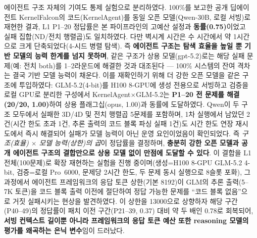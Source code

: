 \documentclass[sigplan,screen,review,anonymous]{acmart}
\begin{document}
에이전트 구조 자체의 기여도 통제 실험으로 분리하였다. 100\%를 보고한 공개 딥에이전트 KernelFalcon의 코드(KernelAgent)를 동일 오픈 모델(Qwen-30B, 로컬 서빙)로 재현한 결과, L1 P1--20 정답률은 본 파이프라인의 고예산 설정과 \textbf{동률(0.75)}이었고 실패 집합(ND/전치 행렬곱)도 일치하였다. 다만 벽시계 시간은 수 시간에서 약 1시간으로 크게 단축되었다(4-시드 병렬 탐색). 즉 \textbf{에이전트 구조는 탐색 효율을 높일 뿐 기반 모델의 능력 한계를 넘지 못하며}, 같은 구조가 상용 모델(gpt-5.2)로는 해당 실패 문제(예: 전치 both)를 1--2라운드에 해결한 것과 대조된다 --- 100\% 시스템의 잔여 격차는 결국 기반 모델 능력이 채운다. 이를 재확인하기 위해 더 강한 오픈 모델을 같은 구조에 투입하였다: GLM-5.2(4-bit)를 H100 8-GPU에 생성 전용으로 서빙하고 검증을 로컬 GPU로 분리한 구성에서 KernelAgent$\times$GLM-5.2는 \textbf{P1--20 전 문제를 해결(20/20, 1.00)}하여 상용 플래그십(opus, 1.00)과 동률에 도달하였다. Qwen이 두 구조 모두에서 실패한 3D/4D 및 전치 행렬곱 5문제를 포함하며, 1차 실행에서 남았던 2건(시간 한도 초과 1건, 추론 출력의 코드 블록 파싱 실패 1건)도 시간 한도 연장 재시도에서 즉시 해결되어 실패가 모델 능력이 아닌 운영 요인이었음이 확인되었다. 즉 \emph{구조(효율) $\times$ 모델 능력(상한)의 곱}이 정답률을 결정하며, \textbf{충분히 강한 오픈 모델과 공개 에이전트 구조의 결합만으로 상용 모델 없이 만점에 도달할 수 있다}. 이 결합을 L1 전체(100문제)로 확장 재현하는 실험을 진행 중이며(생성=H100 8-GPU GLM-5.2 4-bit, 검증=로컬 Pro~6000, 문제당 2시간 한도, 두 문제 동시 실행으로 8슬롯 포화), 그 과정에서 에이전트 프레임워크의 응답 토큰 상한(기본 8192)이 GLM의 추론 출력(5--7K 토큰)을 코드 블록 출력 이전에 절단하여 정답 가능한 문제를 ``코드 블록 없음''으로 거짓 실패시키는 현상을 발견하였다. 이 상한을 13000으로 상향하자 해당 구간(P40--49)의 정답률이 패치 이전 구간(P21--39, 0.37) 대비 약 두 배인 0.78로 회복되어, \textbf{서빙 컨텍스트 길이뿐 아니라 프레임워크의 응답 토큰 예산 또한 reasoning 모델의 평가를 왜곡하는 은닉 변수}임이 드러났다.
\end{document}
